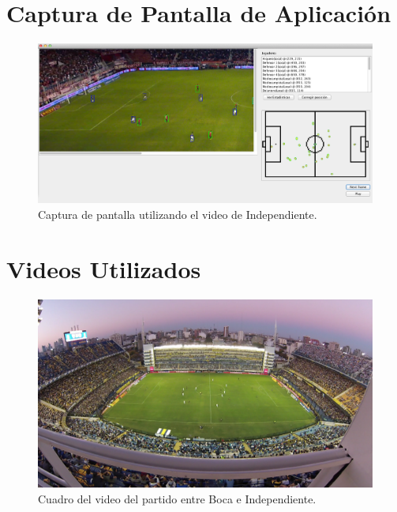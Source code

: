 \newpage
\begin{appendices}
\chapter{Captura de Pantalla de Aplicación}

\begin{figure}[H]
  \centering
  \includegraphics[width=\linewidth]{./images/Screen-Indep.png}
  \caption{Captura de pantalla utilizando el video de Independiente.}
\end{figure}

\chapter{Videos Utilizados}

\begin{figure}[H]
  \centering
  \includegraphics[width=\linewidth]{./images/boca-figura.png}
  \caption{Cuadro del video del partido entre Boca e Independiente.}
\end{figure}


\end{appendices}
